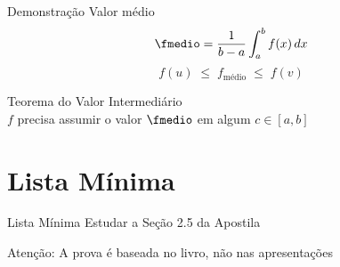 \begin{frame}{Demonstração}
  Valor médio
  \[
    \fmedio = \frac{1}{b-a} \int_a^b f(x)\,dx
  \]
  \pause
  \[
    f(u) \;\leq\; f_{\text{médio}} \;\leq\; f(v)
  \]

  \pause
  \vspace{\baselineskip}
  Teorema do Valor Intermediário \\
  \pause
  \qquad $f$ precisa assumir o valor \(\fmedio\) em algum $c\in[a, b]$
\end{frame}

\section{Lista Mínima}

\begin{frame}{Lista Mínima}
  Estudar a Seção 2.5 da Apostila

  \vfill
  Atenção: A prova é baseada no livro, não nas apresentações
\end{frame}


